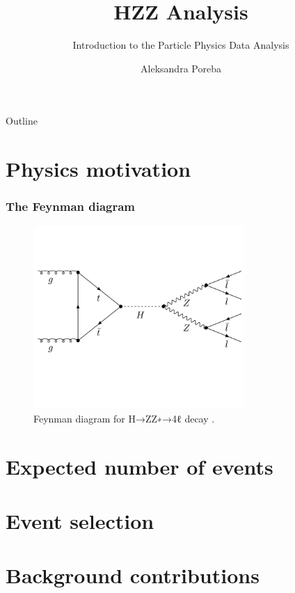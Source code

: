 \documentclass[aspectratio=1610, english]{beamer}
\author[Aleksandra Poreba]{Aleksandra Poreba}
\date{}
\title{HZZ Analysis}
\subtitle{Introduction to the Particle Physics Data Analysis}
\begin{document}
\maketitle

\begin{frame}{Outline}
	\tableofcontents
\end{frame}

\section{Physics motivation}

\begin{frame}
\frametitle{The Feynman diagram}

\begin{figure} [H]
\centering
\includegraphics[width=8cm]{feynman_diagram.png}
\caption{Feynman diagram for H→ZZ∗→4ℓ decay \cite{diagram}. }
\end{figure}

\end{frame}

\section{Expected number of events}

\section{Event selection}

\section{Background contributions}

\end{document}
